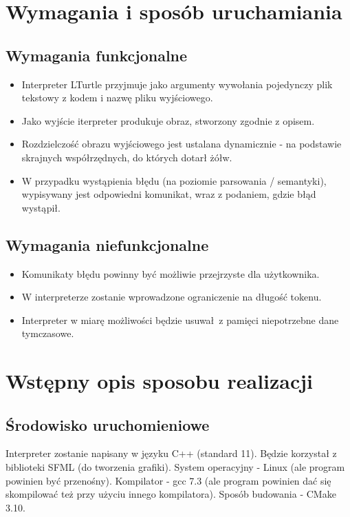 \documentclass{article}
\begin{document}
\section{Wymagania i sposób uruchamiania}

\subsection{Wymagania funkcjonalne}
\begin{itemize}
    \item{Interpreter LTurtle przyjmuje jako argumenty wywołania pojedynczy plik tekstowy z kodem i nazwę pliku wyjściowego.}
    \item{Jako wyjście iterpreter produkuje obraz, stworzony zgodnie z opisem.}
    \item{Rozdzielczość obrazu wyjściowego jest ustalana dynamicznie - na podstawie skrajnych współrzędnych, do których dotarł żółw.}
    \item{W przypadku wystąpienia błędu (na poziomie parsowania / semantyki), wypisywany jest odpowiedni komunikat, wraz z podaniem, gdzie błąd wystąpił.}
\end{itemize}

\subsection{Wymagania niefunkcjonalne}
\begin{itemize}
    \item{Komunikaty błędu powinny być możliwie przejrzyste dla użytkownika.}
    \item{W interpreterze zostanie wprowadzone ograniczenie na długość tokenu.}
    \item{Interpreter w miarę możliwości będzie usuwał z pamięci niepotrzebne dane tymczasowe.}
\end{itemize}


\section{Wstępny opis sposobu realizacji}

\subsection{Środowisko uruchomieniowe}
Interpreter zostanie napisany w języku C++ (standard 11). Będzie korzystał z biblioteki SFML (do tworzenia grafiki). System operacyjny - Linux (ale program powinien być przenośny). Kompilator - gcc 7.3 (ale program powinien dać się skompilować też przy użyciu innego kompilatora). Sposób budowania - CMake 3.10.
\end{document}
